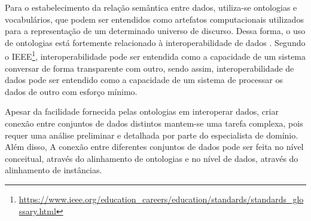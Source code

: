


Para o estabelecimento da relação semântica entre dados, utiliza-se ontologias e vocabulários, que podem ser entendidos como artefatos computacionais utilizados para a representação de um determinado universo de discurso. Dessa forma, o uso de ontologias está fortemente relacionado à interoperabilidade de dados \cite{guarino1998formal, simon2004using, farinelli2013papel}. Segundo o IEEE\footnote{\url{https://www.ieee.org/education_careers/education/standards/standards_glossary.html}}, interoperabilidade pode ser entendida como a capacidade de um sistema conversar de forma transparente com outro, sendo assim, interoperabilidade de dados pode ser entendido como a capacidade de um sistema de processar os dados de outro com esforço mínimo. 

Apesar da facilidade fornecida pelas ontologias em interoperar dados, criar conexão entre conjuntos de dados distintos mantem-se uma tarefa complexa, pois requer uma análise preliminar e detalhada por parte do especialista de domínio. Além disso, 
A conexão entre diferentes conjuntos de dados pode ser feita no nível conceitual, através do alinhamento de ontologias e no nível de dados, através do alinhamento de instâncias.


